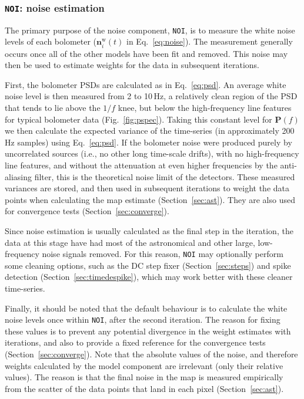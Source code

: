 \documentclass[useAMS,usenatbib,nofootinbib]{mn2e}
\newcommand{\model}[1]{\texttt{#1}}
\begin{document}
\subsubsection{\model{NOI}: noise estimation}
\label{sec:noi}

The primary purpose of the noise component, \model{NOI}, is to measure
the white noise levels of each bolometer ($\mathbf{n}^\mathrm{w}_i(t)$
in Eq.~\ref{eq:noise}). The measurement generally occurs once all of
the other models have been fit and removed. This noise may then be
used to estimate weights for the data in subsequent iterations.

First, the bolometer PSDs are calculated as in Eq.~\ref{eq:psd}. An
average white noise level is then measured from 2 to 10\,Hz, a
relatively clean region of the PSD that tends to lie above the $1/f$
knee, but below the high-frequency line features for typical bolometer
data (Fig.~\ref{fig:pspec}). Taking this constant level for
$\mathbf{P}(f)$ we then calculate the expected variance of the
time-series (in approximately 200\,Hz samples) using
Eq.~\ref{eq:psd}. If the bolometer noise were produced purely by
uncorrelated sources (i.e., no other long time-scale drifts), with no
high-frequency line features, and without the attenuation at even
higher frequencies by the anti-aliasing filter, this is the
theoretical noise limit of the detectors. These measured variances are
stored, and then used in subsequent iterations to weight the data
points when calculating the map estimate (Section~\ref{sec:ast}). They
are also used for convergence tests (Section~\ref{sec:converge}).

Since noise estimation is usually calculated as the final step in the
iteration, the data at this stage have had most of the astronomical
and other large, low-frequency noise signals removed. For this reason,
\model{NOI} may optionally perform some cleaning options, such as the
DC step fixer (Section~\ref{sec:steps}) and spike detection
(Section~\ref{sec:timedespike}), which may work better with these
cleaner time-series.

Finally, it should be noted that the default behaviour is to calculate
the white noise levels once within \model{NOI}, after the second
iteration. The reason for fixing these values is to prevent any
potential divergence in the weight estimates with iterations, and also
to provide a fixed reference for the convergence tests
(Section~\ref{sec:converge}). Note that the absolute values of the
noise, and therefore weights calculated by the model component are
irrelevant (only their relative values). The reason is that the final
noise in the map is measured empirically from the scatter of the data
points that land in each pixel (Section~\ref{sec:ast}).
\end{document}
